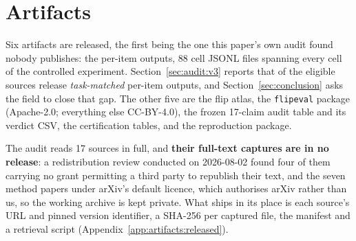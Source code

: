 \section{Artifacts}
\label{sec:artifacts}

Six artifacts are released, the first being the one this paper's own audit found
nobody publishes: the per-item outputs, 88 cell JSONL files spanning every cell
of the controlled experiment.
Section~\ref{sec:audit:v3} reports that \AuditPerItemTaskMatched{} of the
\AuditEligible{} eligible sources release \emph{task-matched} per-item outputs,
and Section~\ref{sec:conclusion} asks the field to close that gap. The other
five are the flip atlas, the \texttt{flipeval} package (Apache-2.0; everything
else CC-BY-4.0), the frozen 17-claim audit table and its verdict CSV, the
certification tables, and the reproduction package.

The audit reads 17 sources in full, and \textbf{their full-text captures are in
no release}: a redistribution review conducted on 2026-08-02 found four of them
carrying no grant permitting a third party to republish their text, and the
seven method papers under arXiv's default licence, which authorises arXiv rather
than us, so the working archive is kept private. What ships in its place is each
source's URL and pinned version identifier, a SHA-256 per captured file, the
manifest and a retrieval script (Appendix~\ref{app:artifacts:released}).

